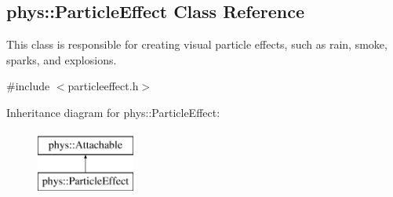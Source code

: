 \hypertarget{classphys_1_1ParticleEffect}{
\subsection{phys::ParticleEffect Class Reference}
\label{classphys_1_1ParticleEffect}
}


This class is responsible for creating visual particle effects, such as rain, smoke, sparks, and explosions.  




{\ttfamily \#include $<$particleeffect.h$>$}

Inheritance diagram for phys::ParticleEffect:\begin{figure}[H]
\begin{center}
\leavevmode
\includegraphics[height=2.000000cm]{classphys_1_1ParticleEffect}
\end{center}
\end{figure}
